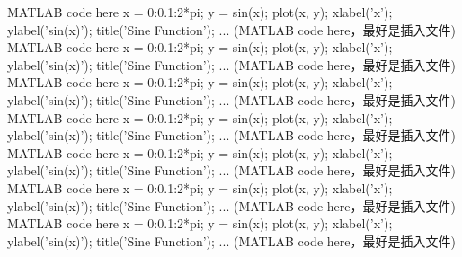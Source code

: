 \documentclass[UTF8]{report}
\theoremstyle{MyLineTheoremStyle} %
\theoremstyle{MyBlockTheoremStyle} %
\theoremstyle{MySubsubsectionStyle} %
\begin{document}

\begin{matlablisting}
MATLAB code here
x = 0:0.1:2*pi;
y = sin(x);
plot(x, y);
xlabel('x');
ylabel('sin(x)');
title('Sine Function');
... (MATLAB code here，最好是插入文件)
MATLAB code here
x = 0:0.1:2*pi;
y = sin(x);
plot(x, y);
xlabel('x');
ylabel('sin(x)');
title('Sine Function');
... (MATLAB code here，最好是插入文件)
MATLAB code here
x = 0:0.1:2*pi;
y = sin(x);
plot(x, y);
xlabel('x');
ylabel('sin(x)');
title('Sine Function');
... (MATLAB code here，最好是插入文件)
MATLAB code here
x = 0:0.1:2*pi;
y = sin(x);
plot(x, y);
xlabel('x');
ylabel('sin(x)');
title('Sine Function');
... (MATLAB code here，最好是插入文件)
MATLAB code here
x = 0:0.1:2*pi;
y = sin(x);
plot(x, y);
xlabel('x');
ylabel('sin(x)');
title('Sine Function');
... (MATLAB code here，最好是插入文件)
MATLAB code here
x = 0:0.1:2*pi;
y = sin(x);
plot(x, y);
xlabel('x');
ylabel('sin(x)');
title('Sine Function');
... (MATLAB code here，最好是插入文件)%
MATLAB code here
x = 0:0.1:2*pi;
y = sin(x);
plot(x, y);
xlabel('x');
ylabel('sin(x)');
title('Sine Function');
... (MATLAB code here，最好是插入文件)
\end{matlablisting}


\end{document}
